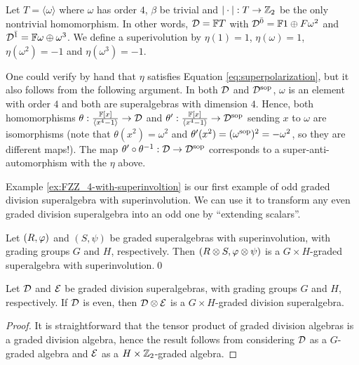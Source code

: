 \begin{ex}\label{ex:FZZ_4-with-superinvoltion}
    Let $T= \langle \omega \rangle$ where $\omega$ has order $4$, $\beta$ be trivial and $| \cdot |: T \to \mathbb{Z}_2$ be the only nontrivial homomorphism. In other words, $\mathcal{D} = \mathbb{F} T$ with $\mathcal{D}^{\bar0} = \mathbb{F} 1 \oplus F \omega^2$ and $\mathcal{D}^{\bar1} = \mathbb{F} \omega \oplus \omega^3$. We define a superivolution by $\eta (1) = 1$, $\eta (\omega) = 1$, $\eta (\omega^2) = -1$ and $\eta(\omega^3) = -1$. %
    
    One could verify by hand that $\eta$ satisfies Equation \eqref{eq:superpolarization}, but it also follows from the following argument. 
    In both $\mathcal{D}$ and $\mathcal{D}^{\mathrm{sop}}$, $\omega$ is an element with order $4$ and both are superalgebras with dimension $4$. 
    Hence, both homomorphisms $\theta: \frac{\mathbb{F}[x]}{\langle x^4 - 1 \rangle} \to \mathcal{D}$ and $\theta': \frac{\mathbb{F}[x]}{\langle x^4 - 1 \rangle} \to \mathcal{D}^{\mathrm{sop}}$ sending $x$ to $\omega$ are isomorphisms (note that $\theta(x^2) = \omega^2$ and $\theta'(x^2) = (\omega^{\mathrm{sop}})^2 = - \omega^2$, so they are different maps!). 
    The map $\theta'\circ \theta^{-1}: \mathcal{D} \to \mathcal{D}^{\mathrm{sop}}$ corresponds to a super-anti-automorphism with the $\eta$ above.
\end{ex}

Example \ref{ex:FZZ_4-with-superinvoltion} is our first example of odd graded division superalgebra with superinvolution. We can use it to transform any even graded division superalgebra into an odd one by ``extending scalars''.

\begin{lemma}
    Let $(R, \varphi)$ and $(S, \psi)$ be graded superalgebras with superinvolution, with grading groups $G$ and $H$, respectively. Then $(R\otimes S, \varphi\otimes \psi)$ is a $G\times H$-graded superalgebra with superinvolution.\qed
\end{lemma}

\begin{lemma}
    Let $\mathcal{D}$ and $\mathcal E$ be graded division superalgebras, with grading groups $G$ and $H$, respectively. If $\mathcal{D}$ is even, then $\mathcal{D} \otimes \mathcal E$ is a $G\times H$-graded division superalgebra.
\end{lemma}

\begin{proof}
    It is straightforward that the tensor product of graded division algebras is a graded division algebra, hence the result follows from considering $\mathcal{D}$ as a $G$-graded algebra and $\mathcal E$ as a $H\times \mathbb{Z}_2$-graded algebra.
\end{proof}

